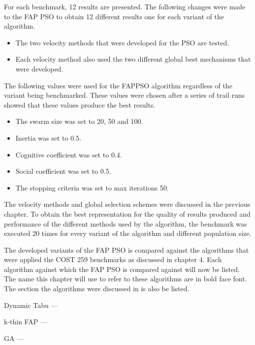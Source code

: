 For each benchmark, 12 results are presented. The following changes were made to the FAP PSO to obtain 12 different results one for each variant of the algorithm.
\begin{itemize}
\item The two velocity methods that were developed for the PSO are tested.
\item Each velocity method also used the two different global best mechanisms that were developed.
\end{itemize}
The following values were used for the FAPPSO algorithm regardless of the variant being benchmarked. These values were chosen after a series of trail runs showed that these values produce the best results.
\begin{itemize}
\item The swarm size was set to 20, 50 and 100.
\item Inertia was set to 0.5.
\item Cognitive coefficient was set to 0.4.
\item Social coefficient was set to 0.5.
\item The stopping criteria was set to max iterations 50.
\end{itemize}
The velocity methods and global selection schemes were discussed in the previous chapter. To obtain the best representation for the quality of results produced and performance of the different methods used by the algorithm, the benchmark was executed 20 times for every variant of the algorithm and different population size.

The developed variants of the FAP PSO is compared against the algorithms that were applied the \gls{COST} 259 benchmarks as discussed in chapter 4. Each algorithm against which the FAP PSO is compared against will now be listed. The name this chapter will use to refer to these algorithms are in bold face font. The section the algorithms were discussed in is also be listed.
\begin{description}
    \item{Dynamic Tabu} ---
    \item{k-thin FAP} ---
    \item{GA} ---
\end{description}

